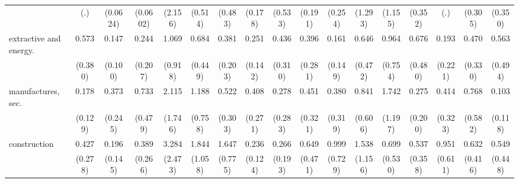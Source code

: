 {\begin{tabular}{l*{16}{c}}
                    &         (.)         &    (0.0624)         &    (0.0602)         &     (2.156)         &     (0.514)         &     (0.483)         &     (0.178)         &     (0.533)         &     (0.191)         &     (0.254)         &     (1.293)         &     (1.155)         &     (0.352)         &         (.)         &     (0.305)         &     (0.350)         \\
[1em]
extractive and energy.&       0.573         &       0.147\sym{**} &       0.244         &       1.069         &       0.684         &       0.381         &       0.251\sym{*}  &       0.436         &       0.396         &       0.161\sym{*}  &       0.646         &       0.964         &       0.676         &       0.193         &       0.470         &       0.563         \\
                    &     (0.380)         &     (0.100)         &     (0.207)         &     (0.918)         &     (0.449)         &     (0.203)         &     (0.142)         &     (0.310)         &     (0.281)         &     (0.149)         &     (0.472)         &     (0.754)         &     (0.480)         &     (0.221)         &     (0.330)         &     (0.494)         \\
[1em]
manufactures, sec.  &       0.178\sym{*}  &       0.373         &       0.733         &       2.115         &       1.188         &       0.522         &       0.408         &       0.278         &       0.451         &       0.380         &       0.841         &       1.742         &       0.275         &       0.414         &       0.768         &       0.103\sym{*}  \\
                    &     (0.129)         &     (0.245)         &     (0.479)         &     (1.746)         &     (0.758)         &     (0.303)         &     (0.271)         &     (0.283)         &     (0.321)         &     (0.319)         &     (0.606)         &     (1.197)         &     (0.200)         &     (0.323)         &     (0.582)         &     (0.118)         \\
[1em]
construction        &       0.427         &       0.196\sym{*}  &       0.389         &       3.284         &       1.844         &       1.647         &       0.236\sym{**} &       0.266         &       0.649         &       0.999         &       1.538         &       0.699         &       0.537         &       0.951         &       0.632         &       0.549         \\
                    &     (0.278)         &     (0.145)         &     (0.266)         &     (2.473)         &     (1.058)         &     (0.775)         &     (0.124)         &     (0.193)         &     (0.471)         &     (0.729)         &     (1.156)         &     (0.530)         &     (0.358)         &     (0.611)         &     (0.416)         &     (0.448)         \\

\end{tabular}}
